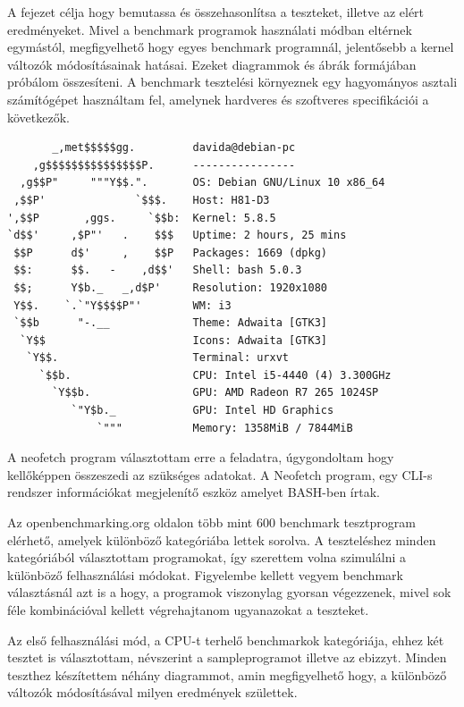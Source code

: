 
A fejezet célja hogy bemutassa és összehasonlítsa a teszteket, illetve az elért eredményeket. Mivel a benchmark programok használati módban eltérnek egymástól, megfigyelhető hogy egyes benchmark programnál, jelentősebb a kernel változók módosításainak hatásai.
Ezeket diagrammok és ábrák formájában próbálom összesíteni.
A benchmark tesztelési környeznek egy hagyományos asztali számítógépet használtam fel, amelynek hardveres és szoftveres specifikációi a következők.

\begin{lstlisting}
       _,met$$$$$gg.         davida@debian-pc 
    ,g$$$$$$$$$$$$$$$P.      ---------------- 
  ,g$$P"     """Y$$.".       OS: Debian GNU/Linux 10 x86_64 
 ,$$P'              `$$$.    Host: H81-D3 
',$$P       ,ggs.     `$$b:  Kernel: 5.8.5 
`d$$'     ,$P"'   .    $$$   Uptime: 2 hours, 25 mins 
 $$P      d$'     ,    $$P   Packages: 1669 (dpkg) 
 $$:      $$.   -    ,d$$'   Shell: bash 5.0.3 
 $$;      Y$b._   _,d$P'     Resolution: 1920x1080 
 Y$$.    `.`"Y$$$$P"'        WM: i3 
 `$$b      "-.__             Theme: Adwaita [GTK3] 
  `Y$$                       Icons: Adwaita [GTK3] 
   `Y$$.                     Terminal: urxvt 
     `$$b.                   CPU: Intel i5-4440 (4) 3.300GHz 
       `Y$$b.                GPU: AMD Radeon R7 265 1024SP 
          `"Y$b._            GPU: Intel HD Graphics 
              `"""           Memory: 1358MiB / 7844MiB
\end{lstlisting}
A neofetch program választottam erre a feladatra, úgygondoltam hogy kellőképpen összeszedi az szükséges adatokat. A Neofetch program, egy CLI-s rendszer információkat megjelenítő eszköz amelyet BASH-ben írtak.



Az openbenchmarking.org oldalon több mint 600 benchmark tesztprogram elérhető, amelyek különböző kategóriába lettek sorolva. A teszteléshez minden kategóriából választottam programokat, így szerettem volna szimulálni a különböző felhasználási módokat. Figyelembe kellett vegyem benchmark választásnál azt is a hogy, a programok viszonylag gyorsan végezzenek, mivel sok féle kombinációval kellett végrehajtanom ugyanazokat a teszteket. 

Az első felhasználási mód, a CPU-t terhelő benchmarkok kategóriája, ehhez két tesztet is választottam, névszerint a sampleprogramot illetve az ebizzyt.
Minden teszthez készítettem néhány diagrammot, amin megfigyelhető hogy, a különböző változók módosításával milyen eredmények születtek.

